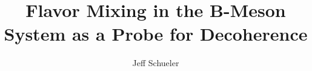 \documentclass[11pt]{uhthesis}
\title{Flavor Mixing in the B-Meson System as a Probe for Decoherence}
\author{Jeff Schueler}
\begin{document}
\maketitle

\begin{frontmatter}

\copyrightpage







\tableofcontents

\listoftables

\listoffigures

\end{frontmatter}



\appendix



\nocite{*}



%
\end{document}
